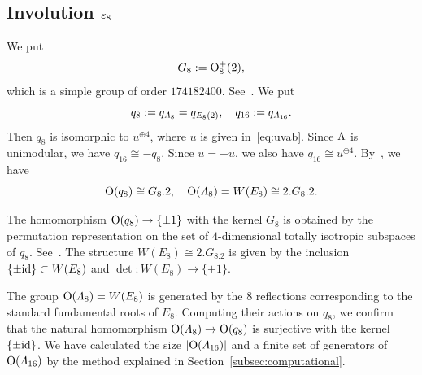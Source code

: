 \documentclass{amsart} %
\begin{document}
\subsection{Involution $\varepsilon_8$}\label{subsec:vep8}
%
We put
\[
G_8:=\mathord{\mathrm{O}}^+_8(2), 
\]
which is a simple group of order %
$174182400$.
See~\cite[page 85]{MR827219}.
%
%
We put
\[
q_8:=q_{\varLambda_8}=q_{ E_8(2)},
\quad
q_{16}:=q_{\varLambda_{16}}.
\]
Then $q_8$ 
is isomorphic to $u^{\oplus 4}$,
where $u$ is given in~\eqref{eq:uvab}.
Since $\Lambda$ is unimodular, 
we have $q_{16}\cong -q_8$.
Since $u= -u$, 
we also have 
$q_{16}\cong u^{\oplus 4}$.
By~\cite[page~85]{MR827219}, 
we have
\[
\mathord{\mathrm{O}}(q_8)\cong G_8.2, 
\quad 
\mathord{\mathrm{O}}(\varLambda_8)=W(E_8)\cong 2.G_8.2.
\]
%
\begin{remark}\label{rem:2G2}
The homomorphism $\mathord{\mathrm{O}}(q_8)\to \{\pm 1\}$ %
with the kernel $G_8$
is obtained by the permutation representation on
 the set of $4$-dimensional totally isotropic subspaces of 
$q_8$.
See~\cite[Section 3.8]{Wilson2009}.
The structure $W(E_8)\cong 2.G_8.2$ is given by
the inclusion $\{\pm \mathord{\mathrm{id}}\}\subset W(E_8)$ and $\det\colon W(E_8)\to \{\pm 1\}$.
\end{remark}
%
The group $\mathord{\mathrm{O}}(\varLambda_8)=W(E_8)$
is generated by the $8$ reflections
corresponding to the standard fundamental roots of $E_8$.
Computing their actions on $q_8$,
we confirm that 
 the natural homomorphism $\mathord{\mathrm{O}}(\varLambda_8)\to \mathord{\mathrm{O}}(q_8)$ is surjective
with the kernel $\{\pm \mathord{\mathrm{id}}\}$.
We have calculated the size $|\mathord{\mathrm{O}}(\varLambda_{16})|$ and a finite set of generators of $ \mathord{\mathrm{O}}(\varLambda_{16})$
by the method 
explained in Section~\ref{subsec:computational}.
% 
\end{document}
